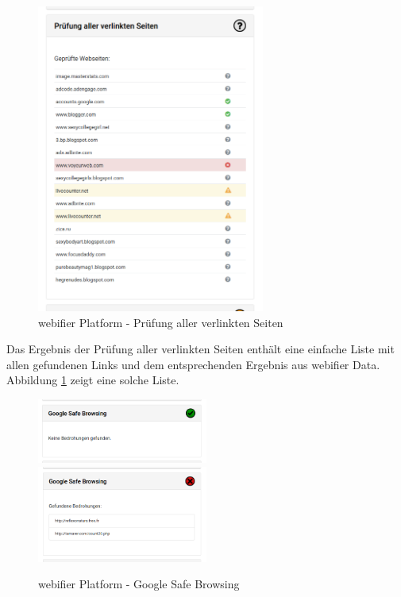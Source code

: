 \begin{figure}[H]
  \centering
  \includegraphics[width=7.5cm]{images/platform/linkchecker-undefined}
  \caption{webifier Platform - Prüfung aller verlinkten Seiten}
  \label{fig:platform-result-linkchecker}
\end{figure}

Das Ergebnis der Prüfung aller verlinkten Seiten enthält eine einfache Liste mit allen gefundenen Links und dem entsprechenden Ergebnis aus webifier Data. Abbildung \ref{fig:platform-result-linkchecker} zeigt eine solche Liste.

\begin{figure}[H]
\centerline{%
\includegraphics[width=0.5\textwidth]{images/platform/google-safe-browsing-clean}%
\includegraphics[width=0.5\textwidth]{images/platform/google-safe-browsing-malicious}%
}%
\caption{webifier Platform - Google Safe Browsing}
\label{fig:platform-result-google-safe-browsing}
\end{figure}

